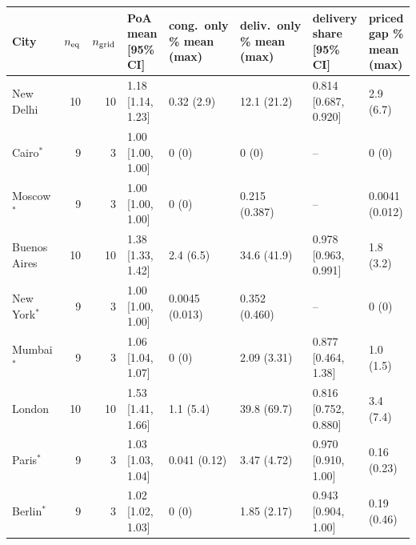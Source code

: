 \begin{tabular}{lrrlllll}
\toprule
City & $n_{\rm eq}$ & $n_{\rm grid}$ & PoA mean [95\% CI] & cong.\ only \% mean (max) & deliv.\ only \% mean (max) & delivery share [95\% CI] & priced gap \% mean (max) \\
\midrule
New Delhi & 10 & 10 & 1.18 [1.14, 1.23] & 0.32 (2.9) & 12.1 (21.2) & 0.814 [0.687, 0.920] & 2.9 (6.7) \\
Cairo$^*$ & 9 & 3 & 1.00 [1.00, 1.00] & 0 (0) & 0 (0) & -- & 0 (0) \\
Moscow$^*$ & 9 & 3 & 1.00 [1.00, 1.00] & 0 (0) & 0.215 (0.387) & -- & 0.0041 (0.012) \\
Buenos Aires & 10 & 10 & 1.38 [1.33, 1.42] & 2.4 (6.5) & 34.6 (41.9) & 0.978 [0.963, 0.991] & 1.8 (3.2) \\
New York$^*$ & 9 & 3 & 1.00 [1.00, 1.00] & 0.0045 (0.013) & 0.352 (0.460) & -- & 0 (0) \\
Mumbai$^*$ & 9 & 3 & 1.06 [1.04, 1.07] & 0 (0) & 2.09 (3.31) & 0.877 [0.464, 1.38] & 1.0 (1.5) \\
London & 10 & 10 & 1.53 [1.41, 1.66] & 1.1 (5.4) & 39.8 (69.7) & 0.816 [0.752, 0.880] & 3.4 (7.4) \\
Paris$^*$ & 9 & 3 & 1.03 [1.03, 1.04] & 0.041 (0.12) & 3.47 (4.72) & 0.970 [0.910, 1.00] & 0.16 (0.23) \\
Berlin$^*$ & 9 & 3 & 1.02 [1.02, 1.03] & 0 (0) & 1.85 (2.17) & 0.943 [0.904, 1.00] & 0.19 (0.46) \\
\bottomrule
\end{tabular}

